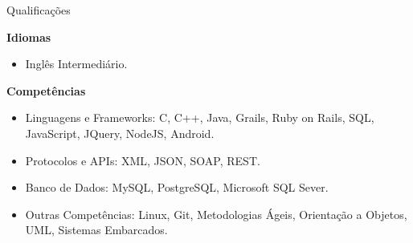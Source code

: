 \documentclass{resume} %
\begin{document}

\begin{rSection}{Qualificações}

\textbf{Idiomas}
\begin{itemize}
	\item Inglês Intermediário.
\end{itemize}

\textbf{Competências}
\begin{itemize}
	\item Linguagens e Frameworks: C, C++, Java, Grails, Ruby on Rails, SQL, JavaScript, JQuery, NodeJS, Android.
	\item Protocolos e APIs: XML, JSON, SOAP, REST.
	\item Banco de Dados: MySQL, PostgreSQL, Microsoft SQL Sever.
	\item Outras Competências: Linux, Git, Metodologias Ágeis, Orientação a Objetos, UML, Sistemas Embarcados.
\end{itemize}

\end{rSection}
\end{document}
